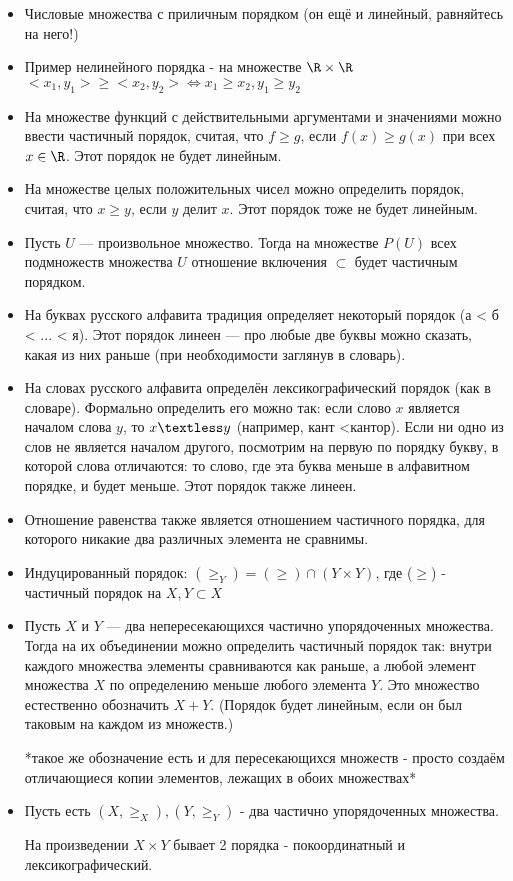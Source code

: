 \begin{itemize}
	\item
		Числовые множества с приличным порядком (он ещё и линейный, равняйтесь на него!)
	\item
		Пример нелинейного порядка - на множестве $\R \times \R$ $<x_1, y_1> \geq <x_2, y_2> \iff x_1 \geq x_2, y_1 \geq y_2$
	\item
		На множестве функций с действительными аргументами и значениями можно ввести частичный порядок, считая, что $f \geq g$,
		 если $f(x) \geq g(x)$ при всех $x \in \R$. Этот порядок не будет линейным.
	\item
		На множестве целых положительных чисел можно определить порядок, считая, что $x \geq y$, если $y$ делит $x$. Этот порядок тоже не будет линейным.
	\item
		Пусть $U$ — произвольное множество. Тогда на множестве $P(U)$ всех подмножеств множества $U$ отношение включения $\subset$ будет частичным порядком.
	\item
		На буквах русского алфавита традиция определяет некоторый порядок (а < б < ... < я). Этот порядок линеен — про любые две буквы можно сказать, какая из них раньше (при необходимости заглянув в словарь).
	\item
		На словах русского алфавита определён лексикографический порядок (как в словаре). Формально определить его можно так: если слово $x$ является началом слова $y$, то $x \textless y$ (например, кант \textless кантор). Если ни одно из слов не является началом другого, посмотрим на первую по порядку букву, в которой слова отличаются: то слово, где эта буква меньше в алфавитном порядке, и будет меньше. Этот порядок также линеен.
	\item
		Отношение равенства также является отношением частичного порядка, для которого никакие два различных элемента не сравнимы.
\end{itemize}


\begin{itemize}
	\item
		Индуцированный порядок: $(\geq_Y) = (\geq) \cap (Y \times Y)$, где ($\geq$) - частичный порядок на $X, Y \subset X$
	\item
		Пусть $X$ и $Y$ — два непересекающихся частично упорядоченных множества. Тогда на их объединении можно определить 
		частичный порядок так: внутри каждого множества элементы сравниваются как раньше, а любой элемент множества $X$ по 
		определению меньше любого элемента $Y$. Это множество естественно обозначить $X + Y$.
		(Порядок будет линейным, если он был таковым на каждом из множеств.)
		
		*такое же обозначение есть и для пересекающихся множеств - просто создаём отличающиеся копии элементов, лежащих в обоих множествах*
	\item
		Пусть есть $(X, \geq_X), (Y, \geq_Y)$ - два частично упорядоченных множества.
		
		На произведении $X \times Y$ бывает 2 порядка - покоординатный и лексикографический. 
\end{itemize}

